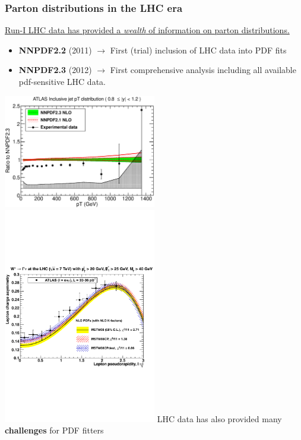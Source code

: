 \documentclass[10pt]{beamer}
\begin{document}
\begin{frame}
\frametitle{Parton distributions in the LHC era}
\underline{Run-I LHC data has provided a \emph{wealth} of information on parton distributions. }
\vskip5pt	
\begin{itemize}
\item \textbf{NNPDF2.2} (2011) $\to$ First (trial) inclusion of LHC data into PDF fits 
\item \textbf{NNPDF2.3} (2012) $\to$ First comprehensive analysis including all available pdf-sensitive LHC data.

\end{itemize}
\includegraphics[width=0.50\textwidth]{figures/ATLASR04JETS36PB_2.eps}
\includegraphics[width=0.50\textwidth]{figures/MSTWcompareatlas.pdf}
\vskip15pt
LHC data has also provided many \textbf{challenges} for PDF fitters
\end{frame}
\end{document}
